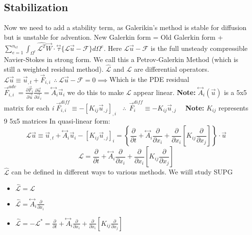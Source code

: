 \documentclass{article}
\begin{document}
\subsection{Stabilization}%
Now we need to add a stability term, as Galerikin's method is stable for diffusion but is unstable for advention. New Galerkin form = Old Galerkin form + $\sum_{e=1}^{n_{el}} \int_{\Omega ^e} \hat{\mathscr{L}^T} \vec{W}\cdot \overset\leftrightarrow{\tau}\{\mathscr{L}\vec{u}-\mathscr{F}\}d\Omega ^e$. Here $\mathscr{L}\vec{u}-\mathscr{F}$ is the full unsteady compressible Navier-Stokes in strong form. We call this a Petrov-Galerkin Method (which is still a weighted residual method). $ \hat{\mathscr{L}}$ and $\mathscr{L}$ are differential operators.
\newline
$\mathscr{L}\vec{u}\equiv\vec{u}_{,t}+\vec{F}_{i,i}~~\therefore~\mathscr{L}\vec{u}-\mathscr{F}=0\implies$Which is the PDE residual
\newline
$\vec{F}_{i,i}^{adv}=\frac{\partial\vec{F}_i}{\partial\vec{u}}\frac{\partial\vec{u}}{\partial\vec{x}_i}=\overset\leftrightarrow{A}_i\vec{u}_i$ we do this to make $\mathscr{L}$ appear linear. \textbf{Note:} $ \overset\leftrightarrow{A}_i(\vec{u})$ is a 5x5 matrix for each \textit{i}
\newline
$\vec{F}_{i,i}^{diff}\equiv - \left[ K_{ij}\vec{u}_{,j} \right]_{,i}~~~~\therefore~~\vec{F}_i^{diff}\equiv - K_{ij}\vec{u}_{,j}~~~~~~$\textbf{Note:} $K_{ij}$ represents 9 5x5 matrices
\vskip 0.1in \noindent
In quasi-linear form:
\begin{equation}
\mathscr{L}\vec{u}\equiv\vec{u}_{,t}+\overset\leftrightarrow{A}_i\vec{u}_i-\left[ K_{ij}\vec{u}_{,j} \right]_i= \left\lbrace \frac{\partial}{\partial t}+\overset\leftrightarrow{A}_i\frac{\partial}{\partial  x_i}+\frac{\partial}{\partial  x_i}\left[ K_{ij}\frac{\partial}{\partial  x_j} \right]  \right\rbrace \cdot \vec{u}
\end{equation}
\begin{equation}
\mathscr{L}=\frac{\partial}{\partial t}+\overset\leftrightarrow{A}_i\frac{\partial}{\partial  x_i}+\frac{\partial}{\partial  x_i}\left[ K_{ij}\frac{\partial}{\partial  x_j} \right]
\end{equation}
$\hat{\mathscr{L}}$ can be defined in different ways to various methods. We wiill study SUPG

\begin{itemize}
	\item{ $\hat{\mathscr{L}}=\mathscr{L}$}
	\item{ $\hat{\mathscr{L}}=\overset\leftrightarrow{A}_i\frac{\partial}{\partial  x_i}$}
	\item{$\hat{\mathscr{L}}=-\mathscr{L}^*=\frac{\partial}{\partial t}+\overset\leftrightarrow{A}_i\frac{\partial}{\partial  x_i}+\frac{\partial}{\partial  x_i}\left[ K_{ij}\frac{\partial}{\partial  x_j} \right]$}
\end{itemize}
\end{document}
